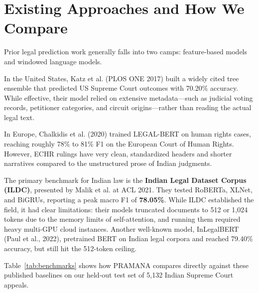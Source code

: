 \documentclass[11pt,a4paper]{article}
\begin{document}
\section{Existing Approaches and How We Compare}
Prior legal prediction work generally falls into two camps: feature-based models and windowed language models.

In the United States, Katz et al. (PLOS ONE 2017) built a widely cited tree ensemble that predicted US Supreme Court outcomes with 70.20\% accuracy. While effective, their model relied on extensive metadata—such as judicial voting records, petitioner categories, and circuit origins—rather than reading the actual legal text.

In Europe, Chalkidis et al. (2020) trained LEGAL-BERT on human rights cases, reaching roughly 78\% to 81\% F1 on the European Court of Human Rights. However, ECHR rulings have very clean, standardized headers and shorter narratives compared to the unstructured prose of Indian judgments.

The primary benchmark for Indian law is the \textbf{Indian Legal Dataset Corpus (ILDC)}, presented by Malik et al. at ACL 2021. They tested RoBERTa, XLNet, and BiGRUs, reporting a peak macro F1 of \textbf{78.05\%}. While ILDC established the field, it had clear limitations: their models truncated documents to 512 or 1,024 tokens due to the memory limits of self-attention, and running them required heavy multi-GPU cloud instances. Another well-known model, InLegalBERT (Paul et al., 2022), pretrained BERT on Indian legal corpora and reached 79.40\% accuracy, but still hit the 512-token ceiling.

Table~\ref{tab:benchmarks} shows how PRAMANA compares directly against these published baselines on our held-out test set of 5,132 Indian Supreme Court appeals.
\end{document}
